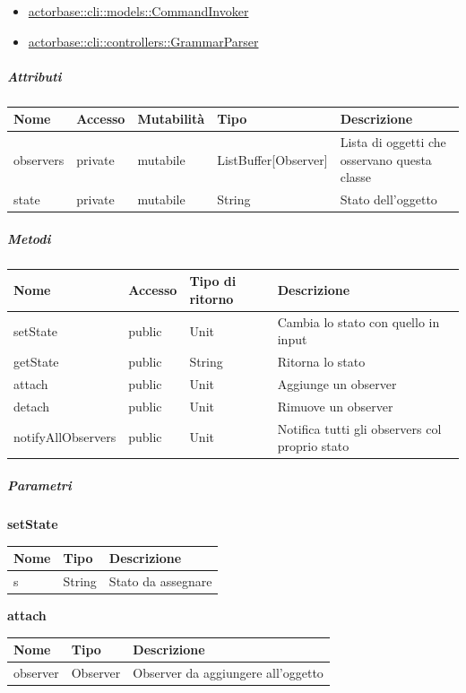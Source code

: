 \documentclass{scalatekids-article}
\begin{document}
\begin{itemize}
\item \hyperref[sec:actorbase::cli::models::CommandInvoker]{actorbase::cli::models::CommandInvoker}
\item \hyperref[sec:actorbase::cli::controllers::GrammarParser]{actorbase::cli::controllers::GrammarParser}
\end{itemize}

\subparagraph{Attributi}

\begin{tabular}{| p{1.5cm} | p{1.5cm} | p{2cm} | p{3.5cm} | p{8.5cm} |}
  \hline
  Nome & Accesso & Mutabilità & Tipo & Descrizione\\
  \hline
  observers & private & mutabile & ListBuffer[Observer] & Lista di oggetti che osservano questa classe\\
  \hline
  state & private & mutabile & String & Stato dell'oggetto\\
  \hline
\end{tabular}

\subparagraph{Metodi}

\begin{tabular}{| l | l | l | l |}
  \hline
  Nome & Accesso & Tipo di ritorno & Descrizione\\
  \hline
  setState & public & Unit & Cambia lo stato con quello in input\\
  \hline
  getState & public & String & Ritorna lo stato\\
  \hline
  attach & public & Unit & Aggiunge un observer\\
  \hline
  detach & public & Unit & Rimuove un observer\\
  \hline
  notifyAllObservers & public & Unit & Notifica tutti gli observers col proprio stato\\
  \hline
\end{tabular}

\subparagraph{Parametri}

\begin{center}
  \textbf{setState}
\end{center}
\begin{tabular}{| p{3cm} | p{3.5cm} | p{8.5cm} |}
  \hline
  Nome & Tipo & Descrizione\\
  \hline
  s & String & Stato da assegnare\\
  \hline
\end{tabular}

\begin{center}
  \textbf{attach}
\end{center}
\begin{tabular}{| p{3cm} | p{3.5cm} | p{8.5cm} |}
  \hline
  Nome & Tipo & Descrizione\\
  \hline
  observer & Observer & Observer da aggiungere all'oggetto\\
  \hline
\end{tabular}
\end{document}
